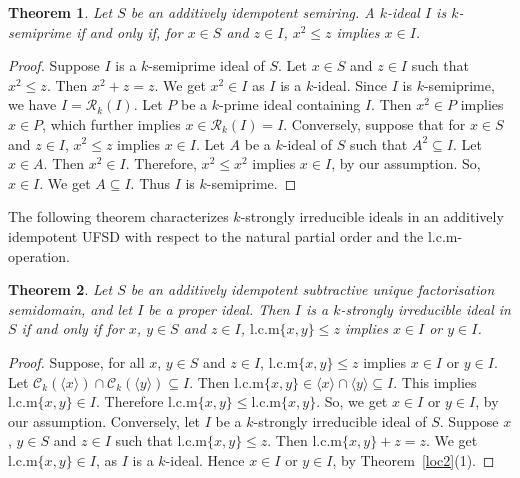\documentclass[11pt,leqno]{amsart}
\newtheorem{theorem}{Theorem}[section]
\theoremstyle{definition}
\numberwithin{equation}{section}
\begin{document}
\begin{theorem}\label{k-semiprime via natural partial order}
    Let $S$ be an additively idempotent semiring. A $k$-ideal $I$ is $k$-semiprime if and only if, for $x\in S$ and $z\in I$, $x^2\leqslant z$ implies $x\in I$.
\end{theorem}

\begin{proof}
Suppose $I$ is a $k$-semiprime ideal of $S$. Let $x \in S$ and $z \in I$ such that $x^2 \leqslant z$. Then $x^2 + z = z$. We get $x^2 \in I$ as $I$ is a $k$-ideal. Since $I$ is $k$-semiprime, we have $I=\mathcal{R}_k(I)$. Let $P$ be a $k$-prime ideal containing $I$. Then $x^2 \in P$ implies $x \in P$, which further implies $x \in \mathcal{R}_k(I) = I$. Conversely, suppose that for $x \in S$ and $z \in I$, $x^2 \leqslant z$ implies $x \in I$. Let $A$ be a $k$-ideal of $S$ such that $A^2 \subseteq I$. Let $x \in A$. Then $x^2 \in I$. Therefore, $x^2 \leqslant x^2$ implies $x \in I$, by our assumption. So, $x \in I$. We get $A \subseteq I$. Thus $I$ is $k$-semiprime.
\end{proof}
 
The  following theorem characterizes $k$-strongly irreducible ideals in an additively idempotent UFSD with respect to the natural partial order and the $\mathrm{l.c.m}$-operation. 
 
\begin{theorem}\label{k-strongly via order and lcm}
Let $S$ be an additively idempotent subtractive unique factorisation semidomain, and let $I$ be a proper ideal. Then $I$ is a $k$-strongly irreducible ideal in $S$ if and only if for $x$, $y \in S$ and $z \in I$, $\mathrm{l.c.m}\{x,y\} \leqslant z$ implies $x \in I$ or $y \in I$.
\end{theorem}

\begin{proof}
    Suppose, for all $x$, $y \in S$ and $z \in I$, $\mathrm{l.c.m}\{x,y\} \leqslant z$ implies $x \in I$ or $y \in I$. Let $\mathcal{C}_k(\langle x \rangle) \cap \mathcal{C}_k(\langle y \rangle) \subseteq I$. Then $\mathrm{l.c.m}\{x,y\} \in \langle x \rangle \cap \langle y \rangle \subseteq I$. This implies $\mathrm{l.c.m}\{x,y\} \in I$. Therefore $\mathrm{l.c.m}\{x,y\} \leqslant \mathrm{l.c.m}\{x,y\}$. So, we get $x \in I$ or $y \in I$, by our assumption. 
    Conversely, let $I$ be a $k$-strongly irreducible ideal of $S$. Suppose $x$, $y \in S$ and $z \in I$ such that $\mathrm{l.c.m}\{x,y\} \leqslant z$. Then $\mathrm{l.c.m}\{x,y\} + z = z$. We get $\mathrm{l.c.m}\{x,y\} \in I$, as $I$ is a $k$-ideal. Hence $x \in I$ or $y \in I$, by Theorem~\ref{loc2}(1).
\end{proof}
\end{document}
